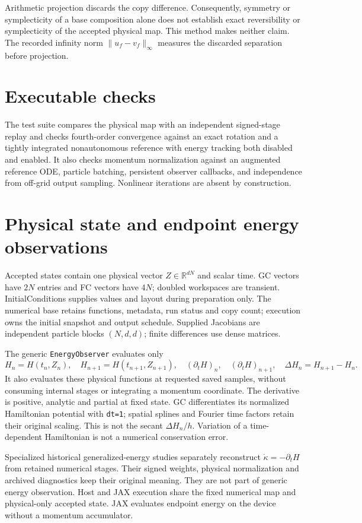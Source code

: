 \documentclass[11pt,a4paper]{article}
\begin{document}
Arithmetic projection discards the copy difference. Consequently, symmetry
or symplecticity of a base composition alone does not establish exact
reversibility or symplecticity of the accepted physical map. This method
makes neither claim. The recorded infinity norm $\|u_f-v_f\|_\infty$ measures
the discarded separation before projection.

\section{Executable checks}
The test suite compares the physical map with an independent signed-stage
replay and checks fourth-order convergence against an exact rotation and a
tightly integrated nonautonomous reference with energy tracking both disabled and enabled.
It also checks momentum normalization against an augmented reference ODE,
particle batching, persistent observer callbacks, and independence from
off-grid output sampling. Nonlinear iterations are absent by construction.
\section{Physical state and endpoint energy observations}
Accepted states contain one physical vector $Z\in\mathbb{R}^{dN}$ and scalar time.
GC vectors have $2N$ entries and FC vectors have $4N$; doubled workspaces are
transient. InitialConditions supplies values and layout during preparation only.
The numerical base retains functions, metadata, run status and copy count;
execution owns the initial snapshot and output schedule. Supplied Jacobians are
independent particle blocks $(N,d,d)$; finite differences use dense matrices.

The generic \texttt{EnergyObserver} evaluates only
\[
 H_n=H(t_n,Z_n),\quad H_{n+1}=H(t_{n+1},Z_{n+1}),\quad
 (\partial_tH)_n,\quad (\partial_tH)_{n+1},\quad
 \Delta H_n=H_{n+1}-H_n.
\]
It also evaluates these physical functions at requested saved samples, without
consuming internal stages or integrating a momentum coordinate. The derivative
is positive, analytic and partial at fixed state. GC differentiates its normalized
Hamiltonian potential with \texttt{dt=1}; spatial splines and Fourier time factors
retain their original scaling. This is not the secant $\Delta H_n/h$.
Variation of a time-dependent Hamiltonian is not a numerical conservation error.

Specialized historical generalized-energy studies separately reconstruct
$\dot\kappa=-\partial_tH$ from retained numerical stages. Their signed weights,
physical normalization and archived diagnostics keep their original meaning.
They are not part of generic energy observation. Host and JAX execution share
the fixed numerical map and physical-only accepted state. JAX evaluates endpoint
energy on the device without a momentum accumulator.
\end{document}
